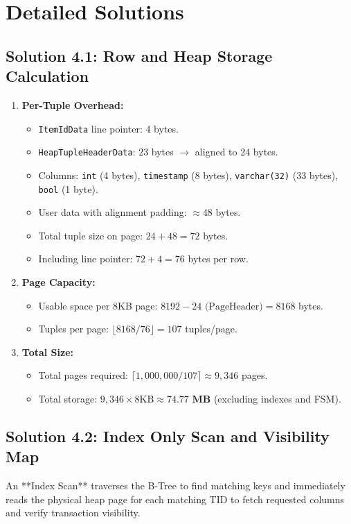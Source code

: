 \section{Detailed Solutions}

\subsection{Solution 4.1: Row and Heap Storage Calculation}
\begin{enumerate}[leftmargin=15pt]
  \item \textbf{Per-Tuple Overhead:}
  \begin{itemize}
    \item \texttt{ItemIdData} line pointer: 4 bytes.
    \item \texttt{HeapTupleHeaderData}: 23 bytes $\rightarrow$ aligned to 24 bytes.
    \item Columns: \texttt{int} (4 bytes), \texttt{timestamp} (8 bytes), \texttt{varchar(32)} (33 bytes), \texttt{bool} (1 byte).
    \item User data with alignment padding: $\approx 48$ bytes.
    \item Total tuple size on page: $24 + 48 = 72$ bytes.
    \item Including line pointer: $72 + 4 = 76$ bytes per row.
  \end{itemize}
  \item \textbf{Page Capacity:}
  \begin{itemize}
    \item Usable space per 8KB page: $8192 - 24 \text{ (PageHeader)} = 8168$ bytes.
    \item Tuples per page: $\lfloor 8168 / 76 \rfloor = 107$ tuples/page.
  \end{itemize}
  \item \textbf{Total Size:}
  \begin{itemize}
    \item Total pages required: $\lceil 1,000,000 / 107 \rceil \approx 9,346$ pages.
    \item Total storage: $9,346 \times 8\text{KB} \approx \mathbf{74.77\text{ MB}}$ (excluding indexes and FSM).
  \end{itemize}
\end{enumerate}

\subsection{Solution 4.2: Index Only Scan and Visibility Map}
An **Index Scan** traverses the B-Tree to find matching keys and immediately reads the physical heap page for each matching TID to fetch requested columns and verify transaction visibility. 

